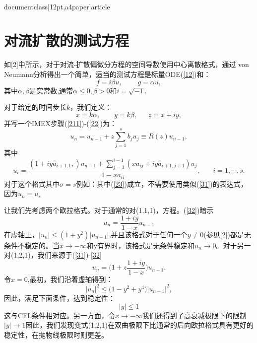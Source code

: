 \\documentclass[12pt,a4paper]{article}
\begin{document}
\section{对流扩散的测试方程}

如[2]中所示，对于对流-扩散偏微分方程的空间导数使用中心离散格式，通过 von Neumann分析得出一个简单，适当的测试方程是标量ODE(\ref{12})和：
\begin{equation*}
f=i\beta u,~~~~~~~~~~g=\alpha u,
\end{equation*}
其中$\alpha,\beta$是实常数,通常$\alpha\le 0,\beta>0$和$i=\sqrt{-1}$.

对于给定的时间步长$k$，我们定义：
\begin{equation*}
x=k\alpha,~~~~~~~~~y=k\beta,~~~~~~~z=x+iy,
\end{equation*}
并写一个IMEX步骤(\ref{211})-(\ref{22})为：
\begin{equation}
u_{n}=u_{n-1}+z\sum_{j=1}^{s}b_{j}u_{j}\equiv R(z)u_{n-1},
\label{31}
\end{equation}
其中
\begin{equation}
u_{i}=\frac{(1+iy\widehat{a}_{i+1,1},)u_{n-1}+\sum_{j=1}^{i-1}(xa_{ij}+iy\widehat{a}_{i+1,j+1})u_{j}}{1-xa_{ii}},~~~~~~~~i=1,\cdots,s.
\label{32}
\end{equation}
对于这个格式其中$\sigma=s$例如：其中(\ref{23})成立，不需要使用类似(\ref{31})的表达式，因为$u_{n}=u_{s}$

让我们先考虑两个欧拉格式。对于通常的对(1,1,1)，方程。(\ref{32})暗示
\begin{equation*}
u_{n}=\frac{1+iy}{1-x} u_{n-1}
\end{equation*}
在虚轴上，$|u_{n}|\le (1+y^2)|u_{n-1}|$,并且该格式对于任何一个$y\ne 0$(参见[2])都是无条件不稳定的。当$x\to -\infty$和y有界时，该格式是无条件稳定和$u_{n}\to 0$。对于另一对(1,2,1)，我们来源于(\ref{31})-\ref{32}
\begin{equation*}
u_{n}=\bigg(1+z\frac{1+iy}{1-x}\biggl)u_{n-1}.
\end{equation*}
令$x=0$,最初，我们沿着虚轴得到：
\begin{equation*}
|u_{n}|^2\le \bigg(1-y^2+y^4\biggl)|u_{n-1}|^2,
\end{equation*}
因此，满足下面条件，达到稳定性：
\begin{equation*}
|y|\le 1
\end{equation*}
这与CFL条件相对应。另一方面，令$x\to -\infty$我们还得到了高衰减极限下的限制$|y|\to 1$因此，我们发现变式(1,2,1)在双曲极限下比通常的后向欧拉格式具有更好的稳定性，在抛物线极限时则更差。
\end{document}
